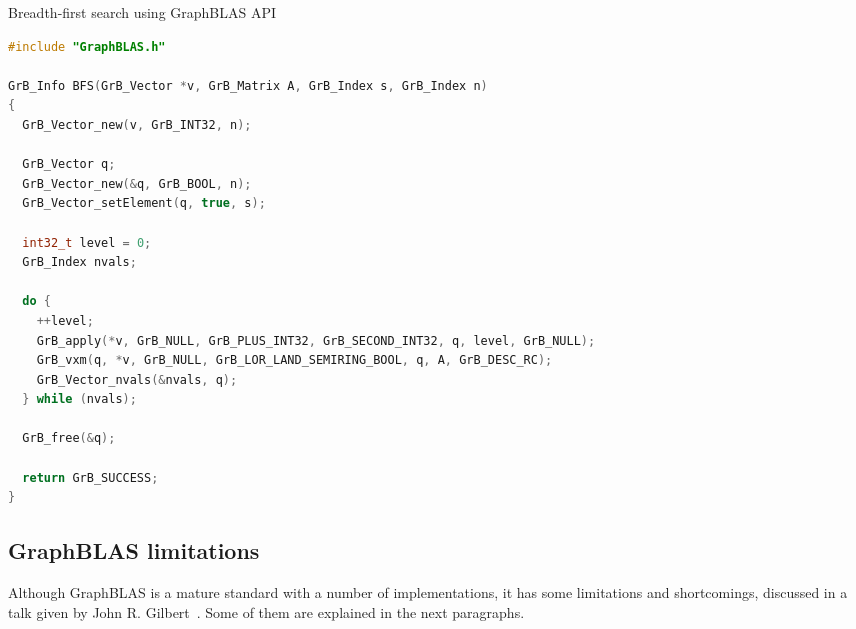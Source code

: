 \begin{algorithm}[]
\caption{Breadth-first search using GraphBLAS API}
\label{alg:bfs_graphblas}
\begin{lstlisting}[language=C++]
#include "GraphBLAS.h"

GrB_Info BFS(GrB_Vector *v, GrB_Matrix A, GrB_Index s, GrB_Index n)
{
  GrB_Vector_new(v, GrB_INT32, n);

  GrB_Vector q;
  GrB_Vector_new(&q, GrB_BOOL, n);
  GrB_Vector_setElement(q, true, s); 

  int32_t level = 0;
  GrB_Index nvals;
  
  do {
    ++level;                                               
    GrB_apply(*v, GrB_NULL, GrB_PLUS_INT32, GrB_SECOND_INT32, q, level, GrB_NULL);       
    GrB_vxm(q, *v, GrB_NULL, GrB_LOR_LAND_SEMIRING_BOOL, q, A, GrB_DESC_RC);                           
    GrB_Vector_nvals(&nvals, q);
  } while (nvals);
  
  GrB_free(&q);

  return GrB_SUCCESS;
}
\end{lstlisting}
\end{algorithm}

\subsection{GraphBLAS limitations}

Although GraphBLAS is a mature standard with a number of implementations, it has some limitations and shortcomings, discussed in a talk given by John R. Gilbert~\cite{talk:graphblas_did_wrong}. Some of them are explained in the next paragraphs. 

